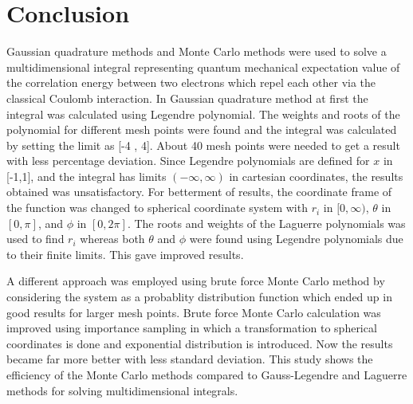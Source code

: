 \chapter{Conclusion}
Gaussian quadrature methods and Monte Carlo methods were used to solve a multidimensional integral representing quantum mechanical expectation value of the correlation energy between two electrons which repel each other via the classical Coulomb interaction. In Gaussian quadrature method at first the integral was calculated using Legendre polynomial. 
The weights and roots of the polynomial for different mesh points were found and the integral was calculated by setting the  limit  as [-4 , 4]. About 40 mesh points were needed to get a result with less percentage deviation. 
Since Legendre polynomials are defined for $x$ in [-1,1], and the integral has limits $(-\infty, \infty)$ in cartesian coordinates, the results obtained was unsatisfactory. 
For betterment of results, the coordinate frame of the function was changed to spherical coordinate system with $r_i$ in $[0,\infty)$, $\theta$ in $[0,\pi]$, and $\phi$ in $[0,2\pi]$.
The roots and weights of the Laguerre polynomials was used to find $r_i$ whereas  both $\theta$ and $\phi$ were found using Legendre polynomials due to their finite limits. 
This gave improved results.  

A different approach was employed using brute force Monte Carlo method by considering the system as a probablity distribution function which ended up in good results for larger mesh points. Brute force Monte Carlo calculation was improved using importance sampling in which a transformation to spherical coordinates is done and exponential distribution is introduced. Now the results became far more better with less standard deviation. This study shows the efficiency of the Monte Carlo methods compared to Gauss-Legendre and Laguerre methods for solving multidimensional integrals.
